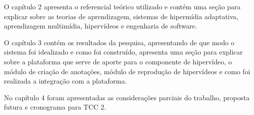 O capítulo 2 apresenta o referencial teórico utilizado e contém uma seção para explicar sobre as teorias de aprendizagem, sistemas de hipermídia adaptativa, aprendizagem multimídia, hipervídeos e engenharia de software.

O capítulo 3 contém os resultados da pesquisa, apresentando de que modo o sistema foi idealizado e como foi construído, apresenta uma seção para explicar sobre a plataforma que serve de aporte para o componente de hipervídeo, o módulo de criação de anotações, módulo de reprodução de hipervídeos e como foi realizada a integração com a plataforma.

No capítulo 4 foram apresentadas as considerações parciais do trabalho, proposta futura e cronograma para TCC 2.